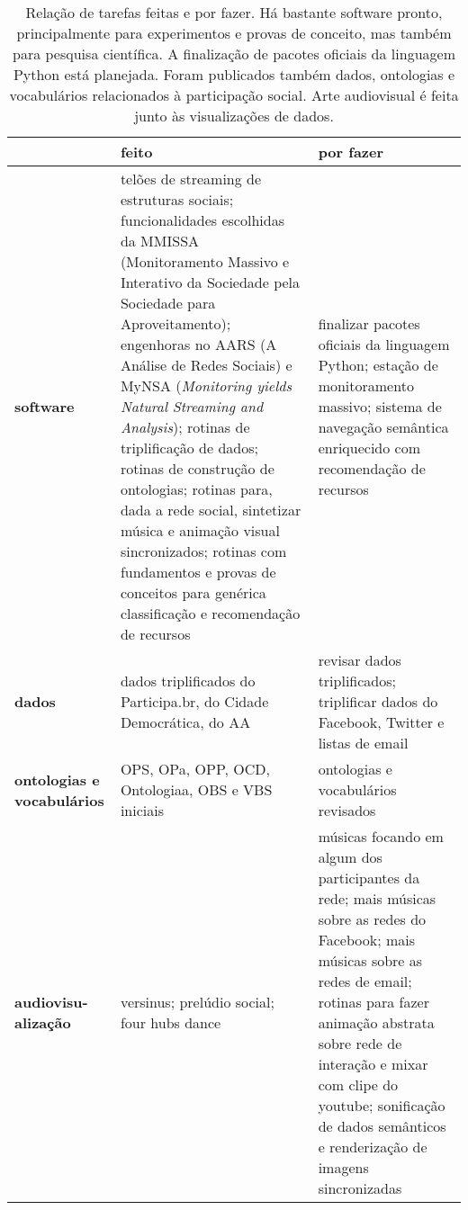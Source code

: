 \documentclass[a4paper,openright,12pt]{report} %
\begin{document}
\begin{table}[!h]
\centering
\footnotesize
\caption{Relação de tarefas feitas e por fazer.
Há bastante software pronto, principalmente para experimentos
e provas de conceito, mas também para pesquisa científica.
A finalização de pacotes oficiais
da linguagem Python está planejada.
Foram publicados também dados, 
ontologias e vocabulários relacionados 
à participação social.
Arte audiovisual é feita junto às visualizações de dados.}\label{tab:afa}
\begin{tabular}{p{1.3cm}||p{7.6cm}|p{7.1cm}}\hline
    & {\bf feito} & {\bf por fazer} \\\hline
                       {\bf software}     & telões de streaming de estruturas sociais;
    funcionalidades escolhidas da MMISSA (Monitoramento Massivo e Interativo da Sociedade pela Sociedade para Aproveitamento);
    engenhoras no AARS (A Análise de Redes Sociais) e MyNSA (\emph{Monitoring yields Natural Streaming and Analysis});
                       rotinas de triplificação de dados; rotinas de construção de ontologias;
                       rotinas para, dada a rede social, sintetizar música e animação visual sincronizados;
                       rotinas com fundamentos e provas de conceitos para genérica classificação e recomendação de recursos
                       & finalizar pacotes oficiais da linguagem Python;
                       estação de monitoramento massivo;
                       sistema de navegação semântica enriquecido com recomendação de recursos
                       \\\hline
                       {\bf dados}        & dados triplificados do Participa.br, do Cidade Democrática, do AA  & revisar dados triplificados;
                       triplificar dados do Facebook, Twitter e listas de email \\\hline
                       {\bf ontologias e vocabulários}  & OPS, OPa, OPP, OCD, Ontologiaa, OBS e VBS iniciais  & ontologias e vocabulários revisados \\\hline
                       {\bf audiovisu-alização}         & versinus; prelúdio social; four hubs dance   & músicas focando em algum dos participantes da rede; mais músicas sobre as redes do Facebook; mais músicas sobre as redes de email; rotinas para fazer animação abstrata sobre rede de interação e mixar com clipe do youtube;
                       sonificação de dados semânticos e renderização de imagens sincronizadas \\\hline
\end{tabular}
\end{table}
\end{document}
